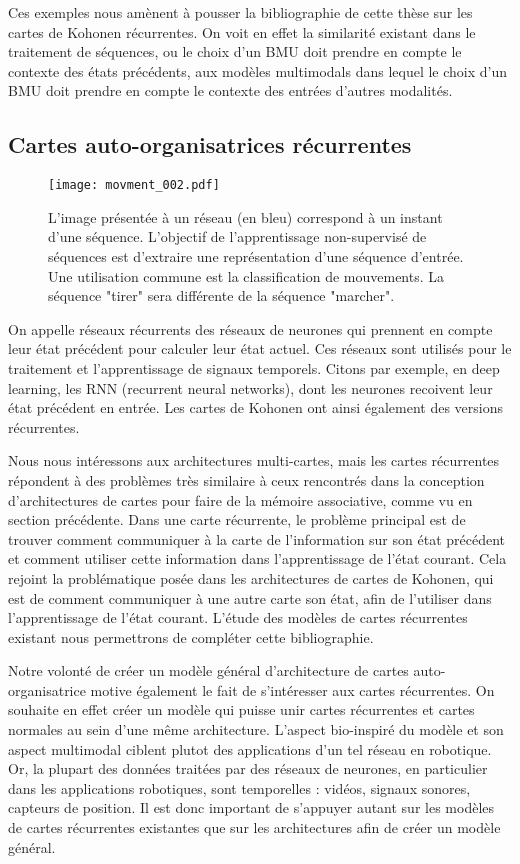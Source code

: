 \documentclass[../main]{subfiles}
\begin{document}
Ces exemples nous amènent à pousser la bibliographie de cette thèse sur les cartes de Kohonen récurrentes. On voit en effet la similarité existant dans le traitement de séquences, ou le choix d'un BMU doit prendre en compte le contexte des états précédents, aux modèles multimodals dans lequel le choix d'un BMU doit prendre en compte le contexte des entrées d'autres modalités. 

\subsection{Cartes auto-organisatrices récurrentes}

\begin{figure}
   \centering\texttt{[image: movment\_002.pdf]}
   \caption{L'image présentée à un réseau (en bleu) correspond à un instant d'une séquence. L'objectif de l'apprentissage non-supervisé de séquences est d'extraire une représentation d'une séquence d'entrée. Une utilisation commune est la classification de mouvements. La séquence "tirer" sera différente de la séquence "marcher".\label{fig:mouvement}}
\end{figure}

On appelle réseaux récurrents des réseaux de neurones qui prennent en compte leur état précédent pour calculer leur état actuel. Ces réseaux sont utilisés pour le traitement et l'apprentissage de signaux temporels. Citons par exemple, en deep learning, les RNN (recurrent neural networks), dont les neurones recoivent leur état précédent en entrée. Les cartes de Kohonen ont ainsi également des versions récurrentes.

Nous nous intéressons aux architectures multi-cartes, mais les cartes récurrentes répondent à des problèmes très similaire à ceux rencontrés dans la conception d'architectures de cartes pour faire de la mémoire associative, comme vu en section précédente.
Dans une carte récurrente, le problème principal est de trouver comment communiquer à la carte de l'information sur son état précédent et comment utiliser cette information dans l'apprentissage de l'état courant. Cela rejoint la problématique posée dans les architectures de cartes de Kohonen, qui est de comment communiquer à une autre carte son état, afin de l'utiliser dans l'apprentissage de l'état courant. L'étude des modèles de cartes récurrentes existant nous permettrons de compléter cette bibliographie. 

Notre volonté de créer un modèle général d'architecture de cartes auto-organisatrice motive également le fait de s'intéresser aux cartes récurrentes. On souhaite en effet créer un modèle qui puisse unir cartes récurrentes et cartes normales au sein d'une même architecture. L'aspect bio-inspiré du modèle et son aspect multimodal ciblent plutot des applications d'un tel réseau en robotique. Or, la plupart des données traitées par des réseaux de neurones, en particulier dans les applications robotiques, sont temporelles : vidéos, signaux sonores, capteurs de position. Il est donc important de s'appuyer autant sur les modèles de cartes récurrentes existantes que sur les architectures afin de créer un modèle général.
\end{document}
